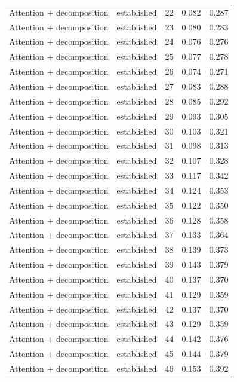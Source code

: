 \begin{tabular}{llrrr}
Attention + decomposition & established & 22 & 0.082 & 0.287 \\
Attention + decomposition & established & 23 & 0.080 & 0.283 \\
Attention + decomposition & established & 24 & 0.076 & 0.276 \\
Attention + decomposition & established & 25 & 0.077 & 0.278 \\
Attention + decomposition & established & 26 & 0.074 & 0.271 \\
Attention + decomposition & established & 27 & 0.083 & 0.288 \\
Attention + decomposition & established & 28 & 0.085 & 0.292 \\
Attention + decomposition & established & 29 & 0.093 & 0.305 \\
Attention + decomposition & established & 30 & 0.103 & 0.321 \\
Attention + decomposition & established & 31 & 0.098 & 0.313 \\
Attention + decomposition & established & 32 & 0.107 & 0.328 \\
Attention + decomposition & established & 33 & 0.117 & 0.342 \\
Attention + decomposition & established & 34 & 0.124 & 0.353 \\
Attention + decomposition & established & 35 & 0.122 & 0.350 \\
Attention + decomposition & established & 36 & 0.128 & 0.358 \\
Attention + decomposition & established & 37 & 0.133 & 0.364 \\
Attention + decomposition & established & 38 & 0.139 & 0.373 \\
Attention + decomposition & established & 39 & 0.143 & 0.379 \\
Attention + decomposition & established & 40 & 0.137 & 0.370 \\
Attention + decomposition & established & 41 & 0.129 & 0.359 \\
Attention + decomposition & established & 42 & 0.137 & 0.370 \\
Attention + decomposition & established & 43 & 0.129 & 0.359 \\
Attention + decomposition & established & 44 & 0.142 & 0.376 \\
Attention + decomposition & established & 45 & 0.144 & 0.379 \\
Attention + decomposition & established & 46 & 0.153 & 0.392 \\

\end{tabular}
